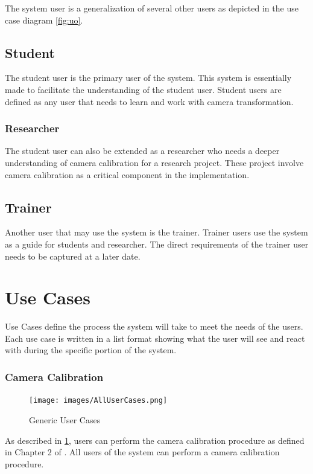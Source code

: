 \documentclass[11pt]{report}
\begin{document}
The system user is a generalization of several other users as depicted in the use case diagram \ref{fig:uo}.  

\subsection{Student}

The student user is the primary user of the system. This system is essentially made to facilitate the understanding of the student user. Student users are defined as any user that needs to learn and work with camera transformation.  

\subsubsection{Researcher}

The student user can also be extended as a researcher who needs a deeper understanding of camera calibration for a research project. These project involve camera calibration as a critical component in the implementation. 

\subsection{Trainer}

Another user that may use the system is the trainer. Trainer users use the system as a guide for students and researcher. The direct requirements of the trainer user needs to be captured at a later date.

\section{Use Cases}

Use Cases define the process the system will take to meet the needs of the users. Each use case is written in a list format showing what the user will see and react with during the specific portion of the system. 
\subsubsection{Camera Calibration}

\begin{figure}[htp]
\centering
\texttt{[image: images/AllUserCases.png]}
\caption{Generic User Cases}
\label{fig:guc}
\end{figure}


As described in \ref{fig:guc}, users can perform the camera calibration procedure as defined in Chapter 2 of \cite{CC}. All users of the system can perform a camera calibration procedure. 
\end{document}
